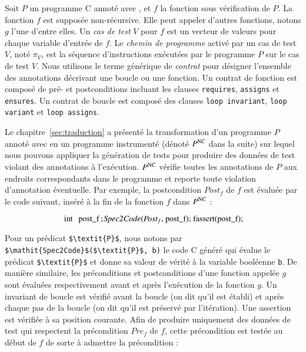 Soit $P$ un programme C annoté avec \eacsl, et $f$ la fonction sous vérification
de $P$.
La fonction $f$ est supposée non-récursive.
Elle peut appeler d'autres fonctions, notons $g$ l'une d'entre elles.
Un \emph{cas de test} $V$ pour $f$ est un vecteur de valeurs pour chaque
variable d'entrée de $f$.
Le \emph{chemin de programme} activé par un cas de test $V$, noté $\pi_V$, est
la séquence d'instructions exécutées par le programme $P$ sur le cas de test
$V$.
Nous utilisons le terme générique de \emph{contrat} pour désigner l'ensemble des
annotations \eacsl décrivant une boucle ou une fonction. 
Un contrat de fonction est composé de pré- et postconditions incluant les
clauses \lstinline{requires}, \lstinline{assigns} et \lstinline{ensures}.
Un contrat de boucle est composé des clauses \lstinline{loop invariant},
\lstinline{loop variant} et \lstinline{loop assigns}.

Le chapitre~\ref{sec:traduction} a présenté la transformation d'un programme
$P$ annoté avec \eacsl en un programme instrumenté (dénoté $P^\mathrm{NC}$ dans la
suite) sur lequel nous pouvons appliquer la génération de tests pour produire
des données de test violant des annotations à l'exécution.
$P^\mathrm{NC}$ vérifie toutes les annotations de $P$ aux endroits correspondants dans
le programme et reporte toute violation d'annotation éventuelle.
Par exemple, la postcondition $\textit{Post}_f$ de $f$ est évaluée par le code
suivant, inséré à la fin de la fonction $f$ dans $P^\mathrm{NC}$ :

\begin{equation}
\mbox{\lstinline[mathescape]'int post_f; $~\mathit{Spec2Code}$($\textit{Post}_f$, post_f); fassert(post_f);'}
\end{equation}

Pour un prédicat \eacsl \lstinline[mathescape]'$\textit{P}$',
nous notons par \lstinline[mathescape]'$\mathit{Spec2Code}$($\textit{P}$, b)'
le code C généré qui évalue le prédicat \lstinline[mathescape]'$\textit{P}$'
et donne sa valeur de vérité à la variable booléenne \lstinline[mathescape]'b'.
De manière similaire, les préconditions et postconditions d'une fonction appelée
$g$ sont évaluées respectivement avant et après l'exécution de la fonction $g$.
Un invariant de boucle est vérifié avant la boucle (on dit qu'il est établi) et
après chaque pas de la boucle (on dit qu'il est préservé par l'itération).
Une assertion est vérifiée à sa position courante.
Afin de produire uniquement des données de test qui respectent la précondition
$\textit{Pre}_f$ de $f$, cette précondition est testée au début de $f$ de sorte
à admettre la précondition :

